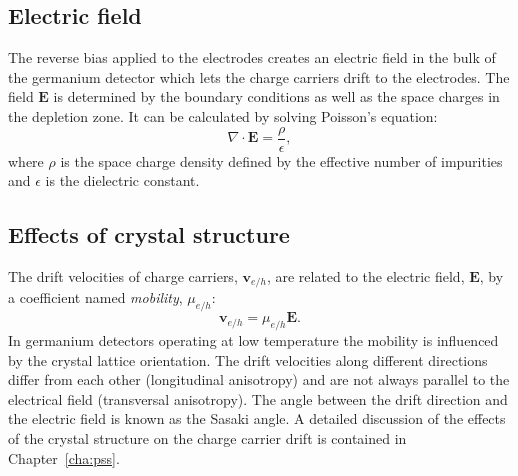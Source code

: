 \subsection{Electric field}
\label{sec:det:field}
The reverse bias applied to the electrodes creates an electric field in the bulk of the germanium detector which lets the charge carriers drift to the electrodes. The field $\mathbf{E}$ is determined by the boundary conditions as well as the space charges in the depletion zone. It can be calculated by solving Poisson's equation:
\begin{equation} 
  \label{eq:det:ef}
  \nabla \cdot \mathbf{E} = \frac{\rho}{\epsilon},  
\end{equation}
where $\rho$ is the space charge density defined by the effective number of impurities and $\epsilon$ is the dielectric constant.

\subsection{Effects of crystal structure}
\label{sec:det:struc}
The drift velocities of charge carriers, $\mathbf{v}_{e/h}$, are related to the electric field, $\mathbf{E}$, by a coefficient named \emph{mobility}, $\mu_{e/h}$:
\begin{equation} 
  \label{eq:det:dv}
  \mathbf{v}_{e/h} = \mu_{e/h} \mathbf{E}.  
\end{equation}
In germanium detectors operating at low temperature the mobility is influenced by the crystal lattice orientation. The drift velocities along different directions differ from each other (longitudinal anisotropy) and are not always parallel to the electrical field (transversal anisotropy). The angle between the drift direction and the electric field is known as the Sasaki angle\cite{Sas56}. A detailed discussion of the effects of the crystal structure on the charge carrier drift is contained in Chapter~\ref{cha:pss}.

